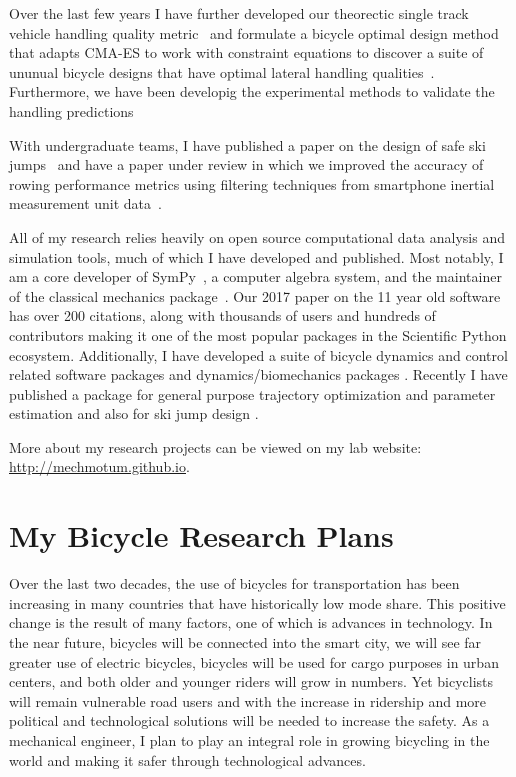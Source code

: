 \documentclass{article}
\begin{document}
Over the last few years I have further developed our theorectic single track
vehicle handling quality metric~\cite{Hess2012} and formulate a bicycle
optimal design method that adapts CMA-ES to work with constraint equations to
discover a suite of ununual bicycle designs that have optimal lateral handling
qualities~\cite{Moore2016,Moore2019a}. Furthermore, we have been developig the
experimental methods to validate the handling
predictions~\cite{Kresie2017,Gilboa2019a}

With undergraduate teams, I have published a paper on the design of safe ski
jumps~\cite{Moore2018} and have a paper under review in which we improved the
accuracy of rowing performance metrics using filtering techniques from
smartphone inertial measurement unit data~\cite{Cloud2019b}.

All of my research relies heavily on open source computational data analysis
and simulation tools, much of which I have developed and published. Most
notably, I am a core developer of SymPy~\cite{SymPyDevelopmentTeam2006}, a
computer algebra system, and the maintainer of the classical mechanics
package~\cite{Gede2013}. Our 2017 paper \cite{Meurer2017} on the 11 year old
software has over 200 citations, along with thousands of users and hundreds of
contributors making it one of the most popular packages in the Scientific
Python ecosystem.  Additionally, I have developed a suite of bicycle dynamics
and control related software packages
\cite{Moore2010b,Moore2011d,Moore2011a,Moore2011e} and dynamics/biomechanics
packages \cite{Dembia2011,Moore2011,Moore2011b} \cite{Moore2013b}
\cite{Moore2017b} \cite{Moore2018a}. Recently I have published a package for
general purpose trajectory optimization and parameter estimation
\cite{Moore2018} and also for ski jump design \cite{Moore2018a}.

More about my research projects can be viewed on my lab website:
\url{http://mechmotum.github.io}.

\section*{My Bicycle Research Plans}
%
Over the last two decades, the use of bicycles for transportation has been
increasing in many countries that have historically low mode share. This
positive change is the result of many factors, one of which is advances in
technology. In the near future, bicycles will be connected into the smart city,
we will see far greater use of electric bicycles, bicycles will be used for
cargo purposes in urban centers, and both older and younger riders will grow in
numbers. Yet bicyclists will remain vulnerable road users and with the increase
in ridership and more political and technological solutions will be needed to
increase the safety. As a mechanical engineer, I plan to play an integral role
in growing bicycling in the world and making it safer through technological
advances.
\end{document}
